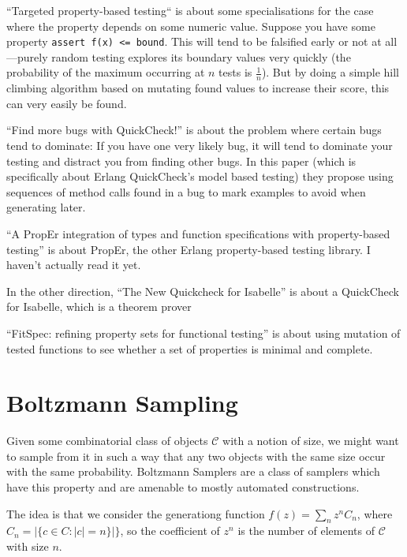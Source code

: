 \documentclass[a4paper]{book}
\begin{document}
``Targeted property-based testing``\cite{DBLP:conf/issta/LoscherS17} is about some specialisations for the case where the property depends on some numeric value.
Suppose you have some property \texttt{assert f(x) <= bound}.
This will tend to be falsified early or not at all---purely
random testing explores its boundary values very quickly (the probability of the maximum occurring at \(n\) tests is \(\frac{1}{n}\)).
But by doing a simple hill climbing algorithm based on mutating found values to increase their score,
this can very easily be found.

``Find more bugs with QuickCheck!''\cite{DBLP:conf/icse/HughesNSA16} is about the problem where certain bugs tend to dominate:
If you have one very likely bug,
it will tend to dominate your testing and distract you from finding other bugs.
In this paper (which is specifically about Erlang QuickCheck's model based testing) they propose using sequences of method calls found in a bug to mark examples to avoid when generating later.

``A PropEr integration of types and function specifications with property-based testing''\cite{DBLP:conf/erlang/PapadakisS11} is about PropEr,
the other Erlang property-based testing library.
I haven't actually read it yet.

In the other direction, ``The New Quickcheck for Isabelle''\cite{DBLP:conf/cpp/Bulwahn12} is about a QuickCheck for Isabelle,
which is a theorem prover

``FitSpec: refining property sets for functional testing''\cite{DBLP:conf/haskell/BraquehaisR16} is about using mutation of tested functions to see whether a set of properties is minimal and complete.

\chapter{Boltzmann Sampling}

Given some combinatorial class of objects \(\mathcal{C}\) with a notion of size,
we might want to sample from it in such a way that any two objects with the same size occur with the same probability.
Boltzmann Samplers are a class of samplers which have this property and are amenable to mostly automated constructions.

The idea is that we consider the generationg function \(f(z) = \sum\limits_n z^n C_n\),
where \(C_n =  |\{c \in C: |c| = n\}|\}\),
so the coefficient of \(z^n\) is the number of elements of \(\mathcal{C}\) with size \(n\).
\end{document}
